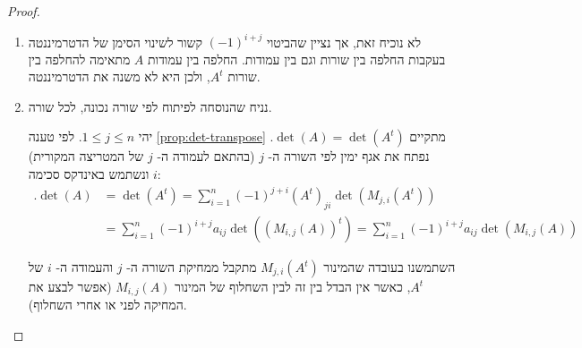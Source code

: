 \documentclass[12pt]{report}
\theoremstyle{plain}
\theoremstyle{definition}
\newcommand{\0}{\mathbf{0}}
\begin{document}
\begin{proof}\
\begin{enumerate}[label=\alph*.]
\item
לא נוכיח זאת, אך נציין שהביטוי
$(-1)^{i+j}$
קשור לשינוי הסימן של הדטרמיננטה בעקבות החלפה בין שורות וגם בין עמודות. החלפה בין עמודות 
$A$
מתאימה להחלפה בין שורות
$A^t$,
ולכן היא לא משנה את הדטרמיננטה.


\item 
נניח שהנוסחה לפיתוח לפי שורה נכונה, לכל שורה. 

יהי 
$1\leq j\leq n$.
לפי טענה
\ref{prop:det-transpose}
מתקיים
$\det(A)=\det(A^t)$.
נפתח את אגף ימין לפי השורה ה-
$j$
(בהתאם לעמודה ה-
$j$
של המטריצה המקורית)
ונשתמש באינדקס סכימה
$i$:
$$
\begin{aligned}
.\det(A)&=\det(A^t)=\sum_{i=1}^n(-1)^{j+i}(A^t)_{ji}\det(M_{j,i}(A^t))\\
&=\sum_{i=1}^n(-1)^{i+j}a_{ij}\det((M_{i,j}(A))^t) =\sum_{i=1}^n(-1)^{i+j}a_{ij}\det(M_{i,j}(A))
\end{aligned}
$$

השתמשנו בעובדה שהמינור
$M_{j,i}(A^t)$
מתקבל ממחיקת השורה ה-
$j$ 
והעמודה ה-
$i$
של
$A^t$, 
כאשר אין הבדל בין זה לבין השחלוף של המינור
$M_{i,j}(A)$
(אפשר לבצע את המחיקה לפני או אחרי השחלוף).



\end{enumerate}
\end{proof}
\end{document}
